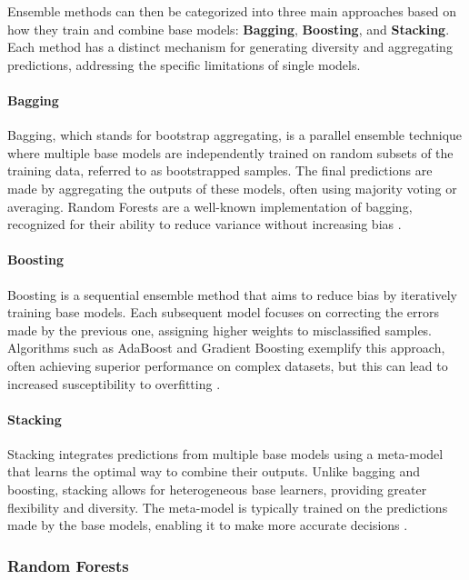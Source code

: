 Ensemble methods can then be categorized into three main approaches based on how they train and combine base models: \textbf{Bagging}, \textbf{Boosting}, and \textbf{Stacking}. 
Each method has a distinct mechanism for generating diversity and aggregating predictions, addressing the specific limitations of single models.

\paragraph{Bagging}
Bagging, which stands for bootstrap aggregating, is a parallel ensemble technique where multiple base models are independently trained on random subsets of the training data, referred to as bootstrapped samples. 
The final predictions are made by aggregating the outputs of these models, often using majority voting or averaging. 
Random Forests are a well-known implementation of bagging, recognized for their ability to reduce variance without increasing bias \parencite{Mienye2022}.

\paragraph{Boosting}
Boosting is a sequential ensemble method that aims to reduce bias by iteratively training base models. 
Each subsequent model focuses on correcting the errors made by the previous one, assigning higher weights to misclassified samples. 
Algorithms such as AdaBoost and Gradient Boosting exemplify this approach, often achieving superior performance on complex datasets, but this can lead to increased susceptibility to overfitting \parencite{Mienye2022}.

\paragraph{Stacking}
Stacking integrates predictions from multiple base models using a meta-model that learns the optimal way to combine their outputs. 
Unlike bagging and boosting, stacking allows for heterogeneous base learners, providing greater flexibility and diversity. 
The meta-model is typically trained on the predictions made by the base models, enabling it to make more accurate decisions \parencite{Mienye2022}.

\subsubsection{Random Forests}


